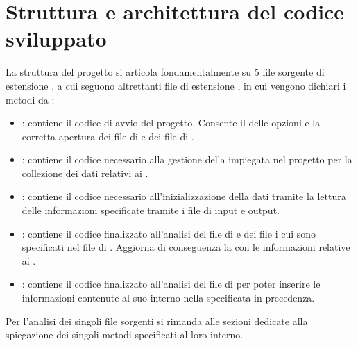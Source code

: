 \documentclass[letterpaper,10pt,italian,openany,oneside]{sphinxmanual}
\begin{document}
\section{Struttura e architettura del codice sviluppato}
\label{\detokenize{project:struttura-e-architettura-del-codice-sviluppato}}
La struttura del progetto si articola fondamentalmente su 5 file sorgente di estensione , a cui seguono altrettanti file di estensione , in cui vengono dichiari i metodi da :
\begin{itemize}
\item {} 
: contiene il codice di avvio del progetto. Consente il  delle opzioni e la corretta apertura dei file di  e dei file di .

\item {} 
: contiene il codice necessario alla gestione della  impiegata nel progetto per la collezione dei dati relativi ai .

\item {} 
: contiene il codice necessario all’inizializzazione della  dati tramite la lettura delle informazioni specificate tramite i file di input e output.

\item {} 
: contiene il codice finalizzato all’analisi del file di  e dei file i cui  sono specificati nel file di . Aggiorna di conseguenza la  con le informazioni relative ai .

\item {} 
: contiene il codice finalizzato all’analisi del file di  per poter inserire le informazioni contenute al suo interno nella  specificata in precedenza.

\end{itemize}

Per l’analisi dei singoli file sorgenti si rimanda alle sezioni dedicate alla spiegazione dei singoli metodi specificati al loro interno.
\end{document}
